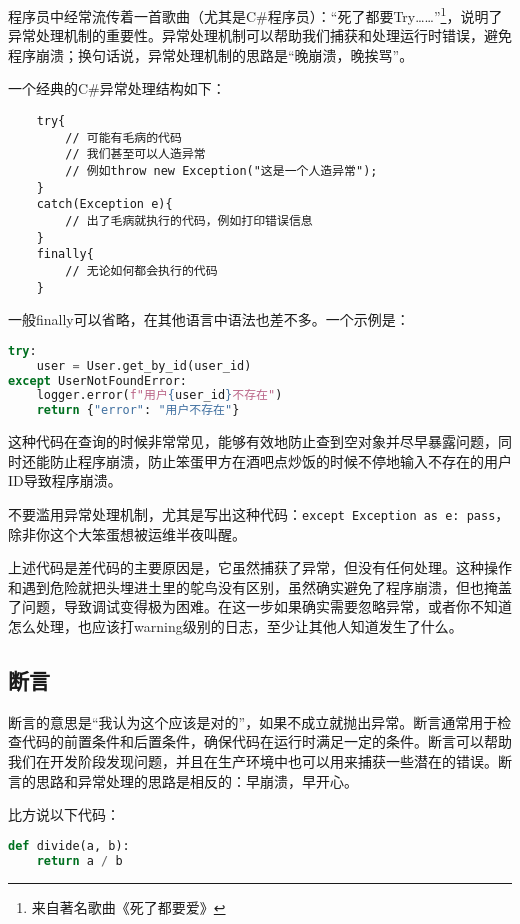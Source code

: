 程序员中经常流传着一首歌曲（尤其是C\#程序员）：“死了都要Try……”\footnote{来自著名歌曲《死了都要爱》}，说明了异常处理机制的重要性。异常处理机制可以帮助我们捕获和处理运行时错误，避免程序崩溃；换句话说，异常处理机制的思路是“晚崩溃，晚挨骂”。

一个经典的C\#异常处理结构如下：
\begin{lstlisting}
    try{
        // 可能有毛病的代码
        // 我们甚至可以人造异常
        // 例如throw new Exception("这是一个人造异常");
    }
    catch(Exception e){
        // 出了毛病就执行的代码，例如打印错误信息
    }
    finally{
        // 无论如何都会执行的代码
    }
\end{lstlisting}

一般finally可以省略，在其他语言中语法也差不多。一个示例是：
\begin{lstlisting}[language=Python]
try:
    user = User.get_by_id(user_id)
except UserNotFoundError:
    logger.error(f"用户{user_id}不存在")
    return {"error": "用户不存在"}
\end{lstlisting}

这种代码在查询的时候非常常见，能够有效地防止查到空对象并尽早暴露问题，同时还能防止程序崩溃，防止笨蛋甲方在酒吧点炒饭的时候不停地输入不存在的用户ID导致程序崩溃。

\begin{caution}
  不要滥用异常处理机制，尤其是写出这种代码：\texttt{except Exception as e: pass}，除非你这个大笨蛋想被运维半夜叫醒。

  上述代码是差代码的主要原因是，它虽然捕获了异常，但没有任何处理。这种操作和遇到危险就把头埋进土里的鸵鸟没有区别，虽然确实避免了程序崩溃，但也掩盖了问题，导致调试变得极为困难。在这一步如果确实需要忽略异常，或者你不知道怎么处理，也应该打warning级别的日志，至少让其他人知道发生了什么。
\end{caution}

\subsection{断言}

断言的意思是“我认为这个应该是对的”，如果不成立就抛出异常。断言通常用于检查代码的前置条件和后置条件，确保代码在运行时满足一定的条件。断言可以帮助我们在开发阶段发现问题，并且在生产环境中也可以用来捕获一些潜在的错误。断言的思路和异常处理的思路是相反的：早崩溃，早开心。

比方说以下代码：

\begin{lstlisting}[language=Python]
def divide(a, b):
    return a / b
\end{lstlisting}

